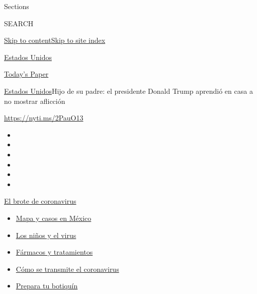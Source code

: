 Sections

SEARCH

\protect\hyperlink{site-content}{Skip to
content}\protect\hyperlink{site-index}{Skip to site index}

\href{https://www.nytimes3xbfgragh.onion/es/section/estados-unidos}{Estados
Unidos}

\href{https://myaccount.nytimes3xbfgragh.onion/auth/login?response_type=cookie\&client_id=vi}{}

\href{https://www.nytimes3xbfgragh.onion/section/todayspaper}{Today's
Paper}

\href{/es/section/estados-unidos}{Estados Unidos}\textbar{}Hijo de su
padre: el presidente Donald Trump aprendió en casa a no mostrar
aflicción

\url{https://nyti.ms/2PauO13}

\begin{itemize}
\item
\item
\item
\item
\item
\item
\end{itemize}

\href{https://www.nytimes3xbfgragh.onion/es/spotlight/coronavirus?action=click\&pgtype=Article\&state=default\&region=TOP_BANNER\&context=storylines_menu}{El
brote de coronavirus}

\begin{itemize}
\tightlist
\item
  \href{https://www.nytimes3xbfgragh.onion/es/interactive/2020/espanol/america-latina/coronavirus-en-mexico.html?action=click\&pgtype=Article\&state=default\&region=TOP_BANNER\&context=storylines_menu}{Mapa
  y casos en México}
\item
  \href{https://www.nytimes3xbfgragh.onion/es/2020/07/31/espanol/ciencia-y-tecnologia/ninos-contagio-coronavirus.html?action=click\&pgtype=Article\&state=default\&region=TOP_BANNER\&context=storylines_menu}{Los
  niños y el virus}
\item
  \href{https://www.nytimes3xbfgragh.onion/es/interactive/2020/science/coronavirus-tratamientos-curas.html?action=click\&pgtype=Article\&state=default\&region=TOP_BANNER\&context=storylines_menu}{Fármacos
  y tratamientos}
\item
  \href{https://www.nytimes3xbfgragh.onion/es/2020/07/06/espanol/ciencia-y-tecnologia/coronavirus-transmision-aire.html?action=click\&pgtype=Article\&state=default\&region=TOP_BANNER\&context=storylines_menu}{Cómo
  se transmite el coronavirus}
\item
  \href{https://www.nytimes3xbfgragh.onion/es/2020/07/14/espanol/estilos-de-vida/botiquin-medicina-coronavirus.html?action=click\&pgtype=Article\&state=default\&region=TOP_BANNER\&context=storylines_menu}{Prepara
  tu botiquín}
\end{itemize}

